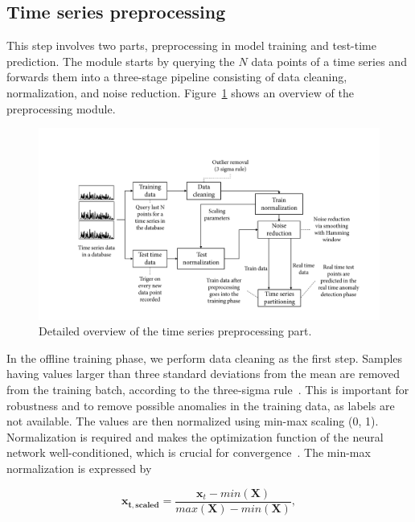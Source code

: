 \subsection{Time series preprocessing}\label{timeseriespreprocessing}

This step involves two parts, preprocessing in model training and test-time prediction. 
The module starts by querying the $N$ data points of a time series and forwards them into a three-stage pipeline consisting of data cleaning, normalization, and noise reduction. Figure~\ref{fig:preprocessingtimeseries} shows an overview of the preprocessing module.

\begin{figure}[htbp]
\centerline{\includegraphics[width=1.0\textwidth]{gfx/chap4/timeseriespreprocessing.pdf}}
\caption{Detailed overview of the time series preprocessing part.}
\label{fig:preprocessingtimeseries}
\end{figure}

In the offline training phase, we perform data cleaning as the first step. Samples having values larger than three standard deviations from the mean are removed from the training batch, according to the three-sigma rule~\cite{pukelsheim1994three}. This is important for robustness and to remove possible anomalies in the training data, as labels are not available. The values are then normalized using min-max scaling (0, 1). Normalization is required and makes the optimization function of the neural network well-conditioned, which is crucial for convergence~\cite{ioffe2015batch}. The min-max normalization is expressed by

\begin{equation}\label{eq8}
\mathbf{x_{t, scaled}} = \frac{\mathbf{x}_t - min(\mathbf{X})}{max(\mathbf{X}) - min(\mathbf{X})},   
\end{equation}

